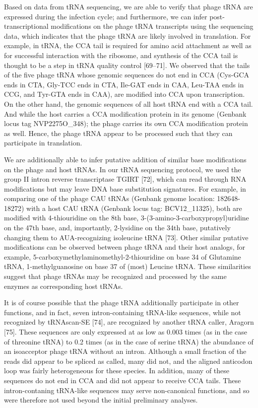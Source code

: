 \documentclass[12pt,twoside]{mitthesis-manusdown}
\begin{document}
Based on data from tRNA sequencing, we are able to verify that phage
tRNA are expressed during the infection cycle; and furthermore, we can
infer post-transcriptional modifications on the phage tRNA transcripts
using the sequencing data, which indicates that the phage tRNA are
likely involved in translation. For example, in tRNA, the CCA tail is
required for amino acid attachment as well as for successful interaction
with the ribosome, and synthesis of the CCA tail is thought to be a step
in tRNA quality control {[}69--71{]}. We observed that the tails of the
five phage tRNA whose genomic sequences do not end in CCA (Cys-GCA ends
in CTA, Gly-TCC ends in CTA, Ile-GAT ends in CAA, Leu-TAA ends in CCG,
and Tyr-GTA ends in CAA), are modified into CCA upon transcription. On
the other hand, the genomic sequences of all host tRNA end with a CCA
tail. And while the host carries a CCA modification protein in its
genome (Genbank locus tag NVP2275O\_348); the phage carries its own CCA
modification protein as well. Hence, the phage tRNA appear to be
processed such that they can participate in translation.

We are additionally able to infer putative addition of similar base
modifications on the phage and host tRNAs. In our tRNA sequencing
protocol, we used the group II intron reverse transcriptase TGIRT
{[}72{]}, which can read through RNA modifications but may leave DNA
base substitution signatures. For example, in comparing one of the phage
CAU tRNAs (Genbank genome location: 182648-18272) with a host CAU tRNA
(Genbank locus tag: BCV12\_11325), both are modified with 4-thiouridine
on the 8th base, 3-(3-amino-3-carboxypropyl)uridine on the 47th base,
and, importantly, 2-lysidine on the 34th base, putatively changing them
to AUA-recognizing isoleucine tRNA {[}73{]}. Other similar putative
modifications can be observed between phage tRNA and their host analogs,
for example, 5-carboxymethylaminomethyl-2-thiouridine on base 34 of
Glutamine tRNA, 1-methylguanosine on base 37 of (most) Leucine tRNA.
These similarities suggest that phage tRNAs may be recognized and
processed by the same enzymes as corresponding host tRNAs.

It is of course possible that the phage tRNA additionally participate in
other functions, and in fact, seven intron-containing tRNA-like
sequences, while not recognized by tRNAscan-SE {[}74{]}, are recognized
by another tRNA caller, Aragorn {[}75{]}. These sequences are only
expressed at as low as 0.003 times (as in the case of threonine tRNA) to
0.2 times (as in the case of serine tRNA) the abundance of an
isoacceptor phage tRNA without an intron. Although a small fraction of
the reads did appear to be spliced as called, many did not, and the
aligned anticodon loop was fairly heterogeneous for these species. In
addition, many of these sequences do not end in CCA and did not appear
to receive CCA tails. These intron-contaning tRNA-like sequences may
serve non-canonical functions, and so were therefore not used beyond the
initial preliminary analyses.
\end{document}
